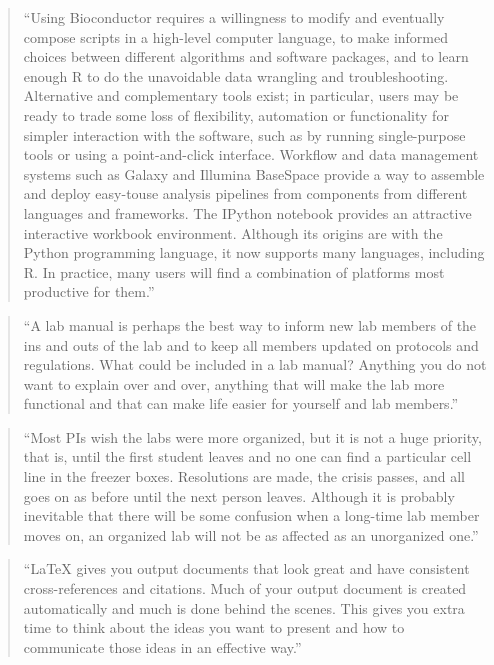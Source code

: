 \documentclass[]{tufte-book}
\begin{document}
\begin{quote}
``Using Bioconductor requires a willingness to modify and eventually compose
scripts in a high-level computer language, to make informed choices between
different algorithms and software packages, and to learn enough R to do the
unavoidable data wrangling and troubleshooting. Alternative and complementary
tools exist; in particular, users may be ready to trade some loss of
flexibility, automation or functionality for simpler interaction with the
software, such as by running single-purpose tools or using a point-and-click
interface. Workflow and data management systems such as Galaxy and Illumina
BaseSpace provide a way to assemble and deploy easy-touse analysis pipelines
from components from different languages and frameworks. The IPython notebook
provides an attractive interactive workbook environment. Although its origins
are with the Python programming language, it now supports many languages,
including R. In practice, many users will find a combination of platforms most
productive for them.'' \citep{huber2015orchestrating}
\end{quote}

\begin{quote}
``A lab manual is perhaps the best way to inform new lab members of the ins
and outs of the lab and to keep all members updated on protocols and
regulations. What could be included in a lab manual? Anything you do not
want to explain over and over, anything that will make the lab more
functional and that can make life easier for yourself and lab members.'' \citep{leips2010helm}
\end{quote}

\begin{quote}
``Most PIs wish the labs were more organized, but it is not a huge priority,
that is, until the first student leaves and no one can find a particular
cell line in the freezer boxes. Resolutions are made, the crisis passes,
and all goes on as before until the next person leaves. Although it is
probably inevitable that there will be some confusion when a long-time
lab member moves on, an organized lab will not be as affected as an unorganized
one.'' \citep{leips2010helm}
\end{quote}

\begin{quote}
``LaTeX gives you output documents that look great and have consistent
cross-references and citations. Much of your output document is created
automatically and much is done behind the scenes. This gives you extra time to
think about the ideas you want to present and how to communicate those ideas in
an effective way.'' \citep{van2012latex}
\end{quote}
\end{document}
